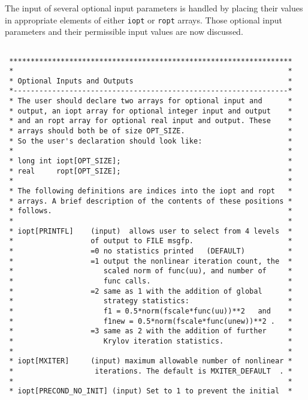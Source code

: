 The input of several optional input parameters is handled by placing
their values in appropriate elements of either {\tt iopt} or {\tt ropt} arrays.
Those optional input parameters and their permissible input values are now
discussed.
\small
\begin{verbatim}

 ******************************************************************
 *                                                                *
 * Optional Inputs and Outputs                                    *
 *----------------------------------------------------------------*
 * The user should declare two arrays for optional input and      *
 * output, an iopt array for optional integer input and output    *
 * and an ropt array for optional real input and output. These    *
 * arrays should both be of size OPT_SIZE.                        *
 * So the user's declaration should look like:                    *
 *                                                                *
 * long int iopt[OPT_SIZE];                                       *
 * real     ropt[OPT_SIZE];                                       *
 *                                                                *
 * The following definitions are indices into the iopt and ropt   *
 * arrays. A brief description of the contents of these positions *
 * follows.                                                       *
 *                                                                *
 * iopt[PRINTFL]    (input)  allows user to select from 4 levels  *
 *                  of output to FILE msgfp.                      *
 *                  =0 no statistics printed   (DEFAULT)          *
 *                  =1 output the nonlinear iteration count, the  *
 *                     scaled norm of func(uu), and number of     *
 *                     func calls.                                *
 *                  =2 same as 1 with the addition of global      *
 *                     strategy statistics:                       *
 *                     f1 = 0.5*norm(fscale*func(uu))**2   and    *
 *                     f1new = 0.5*norm(fscale*func(unew))**2 .   *
 *                  =3 same as 2 with the addition of further     *
 *                     Krylov iteration statistics.               *
 *                                                                *
 * iopt[MXITER]     (input) maximum allowable number of nonlinear *
 *                   iterations. The default is MXITER_DEFAULT  . *
 *                                                                *
 * iopt[PRECOND_NO_INIT] (input) Set to 1 to prevent the initial  *

\end{verbatim}
